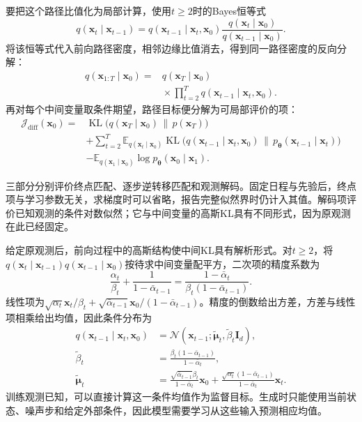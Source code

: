 要把这个路径比值化为局部计算，使用$t\geq2$时的Bayes恒等式
\[
  q(\bm{x}_t\mid\bm{x}_{t-1})
  =q(\bm{x}_{t-1}\mid\bm{x}_t,\bm{x}_0)
     \frac{q(\bm{x}_t\mid\bm{x}_0)}
          {q(\bm{x}_{t-1}\mid\bm{x}_0)}.
\]
将该恒等式代入前向路径密度，相邻边缘比值消去，得到同一路径密度的反向分解：
\[
  \begin{aligned}
    q(\bm{x}_{1:T}\mid\bm{x}_0)
      ={}&q(\bm{x}_T\mid\bm{x}_0)\\
         &{}\times\prod_{t=2}^{T}
              q(\bm{x}_{t-1}\mid\bm{x}_t,\bm{x}_0).
  \end{aligned}
\]
再对每个中间变量取条件期望，路径目标便分解为可局部评价的项：
\begin{equation}
  \label{eq:pgm-generative-ddpm-kl}
  \begin{aligned}
    \mathcal{J}_{\mathrm{diff}}(\bm{x}_0)
      ={}&\operatorname{KL}\bigl(
          q(\bm{x}_T\mid\bm{x}_0)\,\|\,p(\bm{x}_T)\bigr)\\
       &+\sum_{t=2}^{T}
         \mathbb{E}_{q(\bm{x}_t\mid\bm{x}_0)}
          \operatorname{KL}\bigl(
           q(\bm{x}_{t-1}\mid\bm{x}_t,\bm{x}_0)
           \,\|\,p_{\bm{\theta}}(\bm{x}_{t-1}\mid\bm{x}_t)
                         \bigr)\\
       &-\mathbb{E}_{q(\bm{x}_1\mid\bm{x}_0)}
          \log p_{\bm{\theta}}(\bm{x}_0\mid\bm{x}_1).
  \end{aligned}
\end{equation}

三部分分别评价终点匹配、逐步逆转移匹配和观测解码。固定日程与先验后，终点项与学习参数无关，求梯度时可以省略，报告完整似然界时仍计入其值。解码项评价已知观测的条件对数似然；它与中间变量的高斯KL具有不同形式，因为原观测在此已经固定。

给定原观测后，前向过程中的高斯结构使中间KL具有解析形式。对$t\geq2$，将$q(\bm{x}_t\mid\bm{x}_{t-1})q(\bm{x}_{t-1}\mid\bm{x}_0)$按待求中间变量配平方，二次项的精度系数为
\[
  \frac{\alpha_t}{\beta_t}
    +\frac{1}{1-\bar{\alpha}_{t-1}}
  =\frac{1-\bar{\alpha}_t}
          {\beta_t(1-\bar{\alpha}_{t-1})}.
\]
线性项为$\sqrt{\alpha_t}\bm{x}_t/\beta_t+\sqrt{\bar{\alpha}_{t-1}}\bm{x}_0/(1-\bar{\alpha}_{t-1})$。精度的倒数给出方差，方差与线性项相乘给出均值，因此条件分布为
\begin{equation}
  \label{eq:pgm-generative-forward-posterior}
  \begin{aligned}
    q(\bm{x}_{t-1}\mid\bm{x}_t,\bm{x}_0)
      &=\mathcal{N}(\bm{x}_{t-1};
          \widetilde{\bm{\mu}}_t,\widetilde{\beta}_t\bm{I}_d),\\
    \widetilde{\beta}_t
      &=\frac{\beta_t(1-\bar{\alpha}_{t-1})}
              {1-\bar{\alpha}_t},\\
    \widetilde{\bm{\mu}}_t
      &=\frac{\sqrt{\bar{\alpha}_{t-1}}\beta_t}
               {1-\bar{\alpha}_t}\bm{x}_0
       +\frac{\sqrt{\alpha_t}(1-\bar{\alpha}_{t-1})}
               {1-\bar{\alpha}_t}\bm{x}_t.
  \end{aligned}
\end{equation}
训练观测已知，可以直接计算这一条件均值作为监督目标。生成时只能使用当前状态、噪声步和给定外部条件，因此模型需要学习从这些输入预测相应均值。

